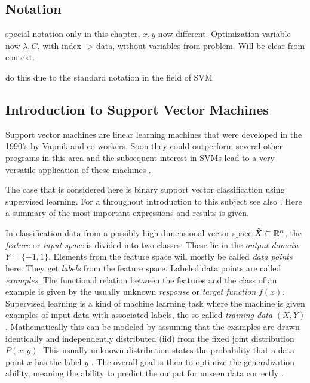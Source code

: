 

\subsection{Notation}

special notation only in this chapter, \(x,y\) now different. Optimization variable now \(\lambda,C\).
with index -> data, without variables from problem.
Will be clear from context.

do this due to the standard notation in the field of SVM

\subsection{Introduction to Support Vector Machines}
Support vector machines are linear learning machines that were developed in the 1990's by Vapnik and co-workers. Soon they could outperform several other programs in this area \cite{Cristianini2000} and the subsequent interest in SVMs lead to a very versatile application of these machines \cite{Kunapuli2008}.

The case that is considered here is binary support vector classification using supervised learning. 
For a throughout introduction to this subject see also \cite{Cristianini2000}. Here a summary of the most important expressions and results is given.

In classification data from a possibly high dimensional vector space \(\tilde{X} \subset \mathbb{R}^n\), the \emph{feature} or \emph{input space} is divided into two classes. These lie in the \emph{output domain} \(\tilde{Y} = \{-1,1\}\). Elements from the feature space will mostly be called \emph{data points} here. They get \emph{labels} from the feature space. Labeled data points are called \emph{examples}.
The functional relation between the features and the class of an example is given by the usually unknown \emph{response} or \emph{target function} \(f(x)\).
Supervised learning is a kind of machine learning task where the machine is given examples of input data with associated labels, the so called \emph{training data} \((X,Y)\). Mathematically this can be modeled by assuming that the examples are  drawn identically and independently distributed (iid) from the fixed joint distribution \(P(x,y)\). This usually unknown distribution states the probability that a data point \(x\) has the label \(y\) \cite[p. 988]{Vapnik1999}.
The overall goal is then to optimize the generalization ability, meaning the ability to predict the output for unseen data correctly \cite[chapter 1.2]{Cristianini2000}.


